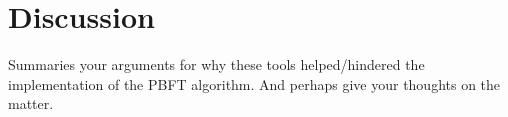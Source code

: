 \chapter{Discussion}
\label{chapter:Dis}
Summaries your arguments for why these tools helped/hindered the implementation of the PBFT algorithm. And perhaps give your thoughts on the matter.
